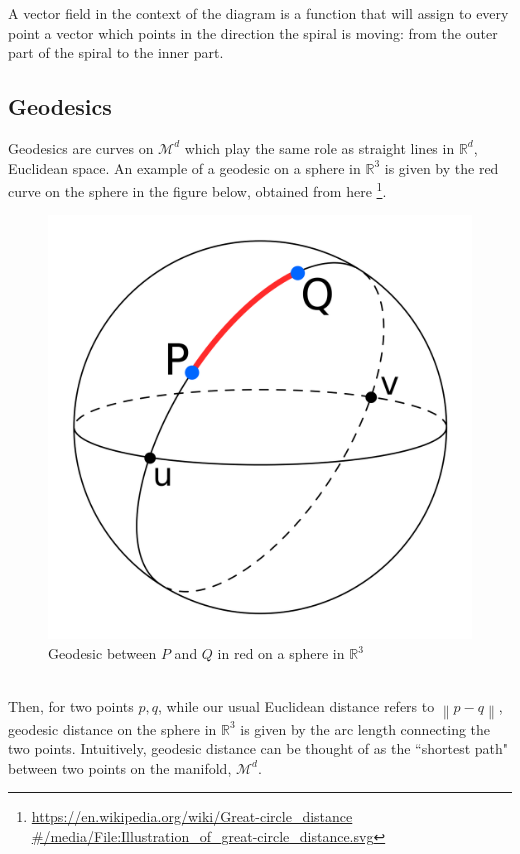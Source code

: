 \documentclass[12pt]{report}
\newcommand\norm[1]{\left\lVert#1\right\rVert}
\begin{document}
A vector field in the context of the diagram is a function 
that will assign to every point a vector which points in the direction the spiral is moving:
from the outer part of the spiral to the inner part.

\newpage

\subsection{Geodesics}
Geodesics are curves on $\mathcal{M}^d$
which play the same role as straight
lines in $\mathbb{R}^d$, Euclidean space. 
An example of a geodesic on a sphere in $\mathbb{R}^3$ 
is given by the red curve on the sphere in the figure below, 
obtained from here \footnote{\url{https://en.wikipedia.org/wiki/Great-circle_distance
\#/media/File:Illustration_of_great-circle_distance.svg}}.
\begin{figure}[ht]
    \begin{center}
        \includegraphics[scale=0.1]{geodesic.png}
        \caption{Geodesic between $P$ and $Q$ in red on a sphere in 
        $\mathbb{R}^3$}
        \label{fig:Illustration of a Geodesic}
    \end{center}
\end{figure}
\\
Then, for two points $p, q$,
while our usual Euclidean distance refers to $\norm{p-q}$, 
geodesic distance on the sphere in $\mathbb{R}^3$ 
is given by the arc length connecting the two points. Intuitively, 
geodesic distance can be thought of as the ``shortest path"
between two points on the manifold, $\mathcal{M}^d$.
\end{document}
